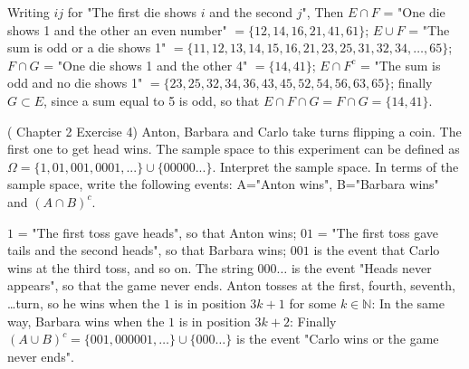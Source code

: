 \begin{ExerciseList}
\Answer
 
	\Answer Writing $ij$ for "The first die shows $i$ and the second $j$", 
	Then $E \cap F$ = "One die shows 1 and the other an even number" $= \{12, 14, 16, 21, 41, 61\}$; $E \cup F$ = "The sum is odd or a die shows 1" $= \{11, 12, 13, 14, 15, 16, 21, 23, 25, 31, 32, 34, \ldots, 65\}$; $F \cap G$ = "One die shows 1 and the other 4" $= \{14, 41\}$; $E \cap F^c$ = "The sum is odd and no die shows 1" $= \{23, 25, 32, 34, 36, 43, 45, 52, 54, 56, 63, 65\}$; finally $G \subset E$, since a sum equal to 5 is odd, so that $E \cap F \cap G = F \cap G = \{14, 41\}$.


%
\Exercise 
\label{e:game}(\cite{Ross} Chapter 2 Exercise 4)
Anton, Barbara  and Carlo take turns flipping a coin. The first one to get head wins. The sample space to this experiment can be defined as $\Omega=\{1,01,001,0001,...\}\cup\{00000...\}$.
\Question Interpret the sample space.
\Question In terms of the sample space, write the following events: A="Anton wins", B="Barbara wins" and $(A\cap B)^c$.

	\Answer 
	\Question $1$ = "The first toss gave heads", so that Anton wins; $01$ = "The first toss gave tails and the second heads", so that Barbara wins; $001$ is the event that Carlo wins at the third toss, and so on. The string $000\ldots$ is the event "Heads never appears", so that the game never ends. 
	\Question Anton tosses at the first, fourth, seventh, \ldots turn, so he wins when the $1$ is in position $3k+1$ for some $k \in \mathbb N$: 
	In the same way, Barbara wins when the $1$ is in position $3k+2$: 
	Finally $(A \cup B)^c = \{001, 000001, \ldots\} \cup \{000\ldots\}$ is the event "Carlo wins or the game never ends".
\end{ExerciseList}



